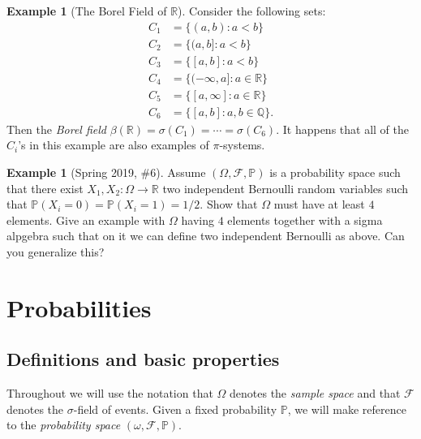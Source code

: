 \documentclass[12pt,reqno]{article}
\renewcommand{\emph}[1]{\textit{#1}}
\theoremstyle{plain}
\theoremstyle{definition}
\newtheorem{example}[theorem]{Example}
\newcommand{\PP}[1]{\ensuremath{\mathbb{P}\left(#1\right)}}
\begin{document}
\begin{example}[The Borel Field of $\mathbb{R}$] 
Consider the following sets:
\begin{align*} 
C_1 & = \{(a,b): a < b\} \\ 
C_2 & = \{(a,b]: a < b\} \\ 
C_3 & = \{[a,b]: a < b\} \\ 
C_4 & = \{(-\infty, a]: a \in \mathbb{R}\} \\ 
C_5 & = \{[a,\infty]: a \in \mathbb{R}\} \\ 
C_6 & = \{[a,b]: a,b \in \mathbb{Q}\}. 
\end{align*} 
Then the \emph{Borel field} 
$\beta(\mathbb{R}) = \sigma(C_1) = \cdots = \sigma(C_6)$. It happens that 
all of the $C_i$'s in this example are also examples of $\pi$-systems. 
\end{example} 

\begin{example}[Spring 2019, \#6]
Assume $(\Omega, \mathcal{F}, \mathbb{P})$ is a probability space such that 
there exist $X_1,X_2: \Omega \rightarrow \mathbb{R}$ two independent 
Bernoulli random variables such that $\PP{X_i = 0} = \PP{X_i = 1} = 1/2$. 
Show that $\Omega$ must have at least $4$ elements. 
Give an example with $\Omega$ having $4$ elements together with a 
sigma alpgebra such that on it we can define two independent Bernoulli as 
above. 
Can you generalize this? 
\end{example} 

\newpage 
\section{Probabilities}

\subsection{Definitions and basic properties} 

Throughout we will use the notation that $\Omega$ denotes the 
\emph{sample space} and that $\mathcal{F}$ denotes the $\sigma$-field of 
events. Given a fixed probability $\mathbb{P}$, we will make reference 
to the \emph{probability space} $(\omega, \mathcal{F}, \mathbb{P})$. 
\end{document}
